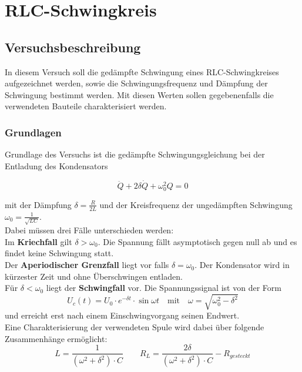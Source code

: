 \documentclass[12pt,a4paper]{article}
\begin{document}
\section{RLC-Schwingkreis}
\subsection{Versuchsbeschreibung}

In diesem Versuch soll die gedämpfte Schwingung eines RLC-Schwingkreises aufgezeichnet werden, sowie die Schwingungsfrequenz und Dämpfung der Schwingung bestimmt werden.
Mit diesen Werten sollen gegebenenfalls die verwendeten Bauteile charakterisiert werden.

\subsubsection{Grundlagen}
Grundlage des Versuchs ist die gedämpfte Schwingungsgleichung bei der Entladung des Kondensators

\begin{equation}
\ddot{Q}+2\delta \dot{Q}+\omega_0^2 Q=0
\end{equation}

mit der Dämpfung $\delta=\frac{R}{2L}$ und der Kreisfrequenz der ungedämpften Schwingung $\omega_0=\frac{1}{\sqrt{LC}}$.\\
Dabei müssen drei Fälle unterschieden werden:\\
Im \textbf{Kriechfall} gilt $\delta > \omega_0$. Die Spannung fällt asymptotisch gegen null ab und es findet keine Schwingung statt.\\
Der \textbf{Aperiodischer Grenzfall} liegt vor falls $\delta=\omega_0$. Der Kondensator wird in kürzester Zeit und ohne Überschwingen entladen.\\
Für $\delta<\omega_0$ liegt der \textbf{Schwingfall} vor. Die Spannungssignal ist von der Form 
\begin{equation}
U_c(t)=U_0 \cdot e^{-\delta t} \cdot \sin{\omega t} \quad \text{mit} \quad \omega=\sqrt{\omega_0^2-\delta^2}
\end{equation}
und erreicht erst nach einem Einschwingvorgang seinen Endwert.\\

Eine Charakterisierung der verwendeten Spule wird dabei über folgende Zusammenhänge ermöglicht:
\begin{equation}
L=\frac{1}{(\omega^2+\delta^2)\cdot C} \qquad  R_L=\frac{2\delta}{(\omega^2+\delta^2)\cdot C}-R_{gesteckt}
\end{equation}
\end{document}
